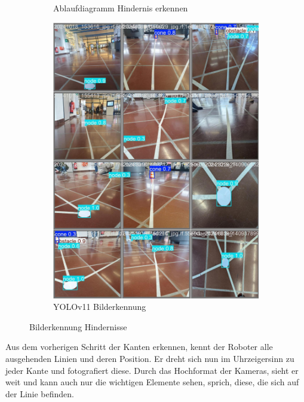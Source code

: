 \begin{figure}[H]
\begin{subfigure}{0.45\textwidth}
\caption{Ablaufdiagramm Hindernis erkennen}
\label{fig:ablaufdiagramm-hindernis-erkennen}
\end{subfigure}
\begin{subfigure}{0.55\textwidth}
\includegraphics[width=\textwidth]{assets/informatik-prototyp/yolo/recognized-images.jpeg}
\caption{YOLOv11 Bilderkennung}
\label{fig:img-recognition-yolo}
\end{subfigure}
\caption{Bilderkennung Hindernisse}
\label{fig:image-detection-obstacles}
\end{figure}



Aus dem vorherigen Schritt der Kanten erkennen, kennt der Roboter alle ausgehenden Linien und deren Position. Er dreht sich nun im Uhrzeigersinn zu jeder Kante und fotografiert diese. Durch das Hochformat der Kameras, sieht er weit und kann auch nur die wichtigen Elemente sehen, sprich, diese, die sich auf der Linie befinden.

